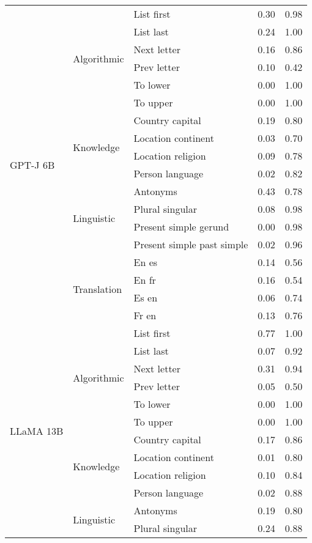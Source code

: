 \begin{center}
\begin{longtable}{lllrr}
\multirow[t]{18}{*}{GPT-J 6B} & \multirow[t]{6}{*}{Algorithmic} & List first & 0.30 & 0.98 \\
 &  & List last & 0.24 & 1.00 \\
 &  & Next letter & 0.16 & 0.86 \\
 &  & Prev letter & 0.10 & 0.42 \\
 &  & To lower & 0.00 & 1.00 \\
 &  & To upper & 0.00 & 1.00 \\
\cline{2-5}
 & \multirow[t]{4}{*}{Knowledge} & Country capital & 0.19 & 0.80 \\
 &  & Location continent & 0.03 & 0.70 \\
 &  & Location religion & 0.09 & 0.78 \\
 &  & Person language & 0.02 & 0.82 \\
\cline{2-5}
 & \multirow[t]{4}{*}{Linguistic} & Antonyms & 0.43 & 0.78 \\
 &  & Plural singular & 0.08 & 0.98 \\
 &  & Present simple gerund & 0.00 & 0.98 \\
 &  & Present simple past simple & 0.02 & 0.96 \\
\cline{2-5}
 & \multirow[t]{4}{*}{Translation} & En es & 0.14 & 0.56 \\
 &  & En fr & 0.16 & 0.54 \\
 &  & Es en & 0.06 & 0.74 \\
 &  & Fr en & 0.13 & 0.76 \\
\cline{1-5} \cline{2-5}
\multirow[t]{18}{*}{LLaMA 13B} & \multirow[t]{6}{*}{Algorithmic} & List first & 0.77 & 1.00 \\
 &  & List last & 0.07 & 0.92 \\
 &  & Next letter & 0.31 & 0.94 \\
 &  & Prev letter & 0.05 & 0.50 \\
 &  & To lower & 0.00 & 1.00 \\
 &  & To upper & 0.00 & 1.00 \\
\cline{2-5}
 & \multirow[t]{4}{*}{Knowledge} & Country capital & 0.17 & 0.86 \\
 &  & Location continent & 0.01 & 0.80 \\
 &  & Location religion & 0.10 & 0.84 \\
 &  & Person language & 0.02 & 0.88 \\
\cline{2-5}
 & \multirow[t]{4}{*}{Linguistic} & Antonyms & 0.19 & 0.80 \\
 &  & Plural singular & 0.24 & 0.88 \\

\end{longtable}
\end{center}
